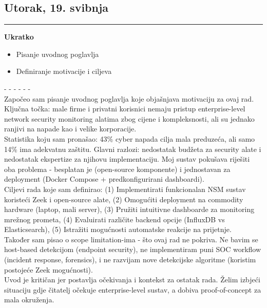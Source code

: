 \documentclass[12pt, a4paper]{article}
\newcommand{\dan}[1]{
    \subsection*{#1}
    \vspace{-0.5em} 
    \hrule \vspace{0.5em} 
}
\begin{document}
\dan{Utorak, 19. svibnja}
\textbf{Ukratko}
\begin{itemize}
    \item Pisanje uvodnog poglavlja
    \item Definiranje motivacije i ciljeva
\end{itemize}
- - - - - - \\
Započeo sam pisanje uvodnog poglavlja koje objašnjava motivaciju za ovaj rad. Ključna točka: male firme i privatni korisnici nemaju pristup enterprise-level network security monitoring alatima zbog cijene i kompleksnosti, ali su jednako ranjivi na napade kao i velike korporacije.
\\
Statistika koju sam pronašao: 43\% cyber napada cilja mala preduzeća, ali samo 14\% ima adekvatnu zaštitu. Glavni razlozi: nedostatak budžeta za security alate i nedostatak ekspertize za njihovu implementaciju. Moj sustav pokušava riješiti oba problema - besplatan je (open-source komponente) i jednostavan za deployment (Docker Compose + predkonfigurirani dashboardi).
\\
Ciljevi rada koje sam definirao: (1) Implementirati funkcionalan NSM sustav koristeći Zeek i open-source alate, (2) Omogućiti deployment na commodity hardware (laptop, mali server), (3) Pružiti intuitivne dashboarde za monitoring mrežnog prometa, (4) Evaluirati različite backend opcije (InfluxDB vs Elasticsearch), (5) Istražiti mogućnosti automatske reakcije na prijetnje.
\\
Također sam pisao o scope limitation-ima - što ovaj rad ne pokriva. Ne bavim se host-based detekcijom (endpoint security), ne implementiram puni SOC workflow (incident response, forensics), i ne razvijam nove detekcijske algoritme (koristim postojeće Zeek mogućnosti).
\\
Uvod je kritičan jer postavlja očekivanja i kontekst za ostatak rada. Želim izbjeći situaciju gdje čitatelj očekuje enterprise-level sustav, a dobiva proof-of-concept za mala okruženja.
\end{document}
